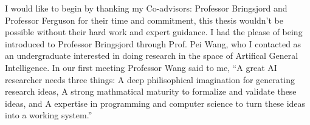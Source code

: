  
 
I would like to begin by thanking my Co-advisors: Professor Bringsjord and Professor Ferguson for their time and commitment, this thesis wouldn't be possible without their hard work and expert guidance. I had the please of being introduced to Professor Bringsjord through Prof. Pei Wang, who I contacted as an undergraduate interested in doing research in the space of Artifical General Intelligence. In our first meeting Professor Wang said to me, ``A great AI researcher needs three things: A deep philisophical imagination for generating research ideas, A strong mathmatical maturity to formalize and validate these ideas, and A expertise in programming and computer science to turn these ideas into a working system.'' 
